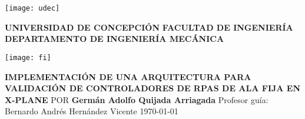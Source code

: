 \begin{titlepage}
	\parbox{1.5cm}{
		\texttt{[image: udec]}
	}
	\hfill
	\parbox[c][2cm]{0.7\textwidth}{
		\centering
		\textbf{UNIVERSIDAD DE CONCEPCIÓN}
		\vfill
		\textbf{FACULTAD DE INGENIERÍA}
		\vfill
		\textbf{DEPARTAMENTO DE INGENIERÍA MECÁNICA}
	}
	\hfill
	\parbox{1.5cm}{
		\texttt{[image: fi]}
	}
	\smallskip
	\vspace*{6cm}
	\centering
	\textbf{IMPLEMENTACIÓN DE UNA ARQUITECTURA PARA VALIDACIÓN DE CONTROLADORES DE RPAS DE ALA FIJA EN X-PLANE}
	\bigbreak
	POR
	\bigbreak
	\textbf{Germán Adolfo Quijada Arriagada}
	\vfill
	Profesor guía:
	\smallbreak
	Bernardo Andrés Hernández Vicente
	\vfill
	\today
\end{titlepage}